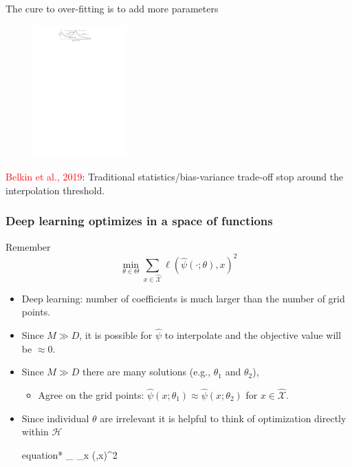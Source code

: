 \documentclass[aspectratio=169,10pt]{beamer}
\newcommand{\Xdom}{\mathcal{X}}
\newcommand{\Xtrain}{\hat{\mathcal{X}}}
\begin{document}
				
\begin{frame}{The cure to over-fitting is to add more parameters}
		\begin{figure}[h!]
			\begin{center}
				\includegraphics[height=2.0in]{./figures/doubledescent.pdf}
			\end{center}
		\end{figure}
		\textcolor{red}{Belkin et al., 2019}: Traditional statistics/bias-variance trade-off stop around the interpolation threshold.		
\end{frame}
	
\begin{frame}
	\frametitle{Deep learning optimizes in a space of functions}
		Remember 
	$$
	\min_{\theta \in \Theta} \sum_{x \in \Xtrain} \ell(\hat{\psi}(\cdot;\theta),x)^2
	$$
	\begin{itemize}
		\item Deep learning: number of coefficients is much larger than the number of grid points.\vspace{0.1in} 
		\item Since $M \gg D$, it is possible for $\hat{\psi}$ to interpolate and the objective value will be $\approx 0$.
		\vspace{0.1in}
		\item Since $M \gg D$ there are many solutions (e.g., $\theta_1$ and $\theta_2$),\vspace{0.1in}
		\begin{itemize}
			\item Agree on the grid points: $\hat{\psi}(x;\theta_1) \approx \hat{\psi}(x;\theta_2)$ for $x \in \Xtrain$.\smallskip
		\end{itemize}
		\medskip
		\item Since individual $\theta$ are irrelevant it is helpful to think of optimization directly within $\mathcal{H}$
		\begin{empheq}[box=\tcbhighmath]{equation*}
			\min_{\hat{\psi} \in {}} \sum_{x \in \Xtrain} \ell(\hat{\psi},x)^2\label{eq:functional-optimization}
		\end{empheq}
	\end{itemize}
\end{frame}
\end{document}
